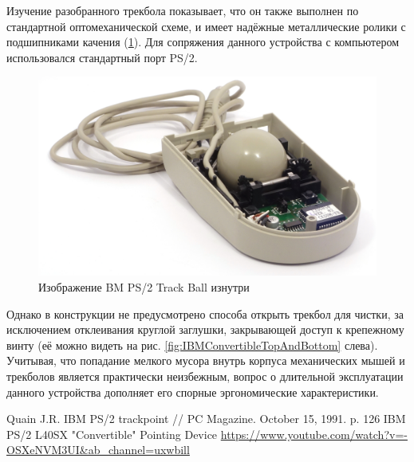 \documentclass[11pt, a4paper]{article}
\begin{document}
Изучение разобранного трекбола показывает, что он также выполнен по стандартной оптомеханической схеме, и имеет надёжные металлические ролики с подшипниками качения (\ref{fig:IBMConvertibleInside}). Для сопряжения данного устройства с компьютером использовался стандартный порт PS/2.

\begin{figure}[h]
    \centering
    \includegraphics[scale=0.7]{1992_ibm_convertible/inside_60.jpg}
    \caption{Изображение BM PS/2 Track Ball изнутри}
    \label{fig:IBMConvertibleInside}
\end{figure}

Однако в конструкции не предусмотрено способа открыть трекбол для чистки, за исключением отклеивания круглой заглушки, закрывающей доступ к крепежному винту (её можно видеть на рис. \ref{fig:IBMConvertibleTopAndBottom} слева). Учитывая, что попадание мелкого мусора внутрь корпуса механических мышей и трекболов является практически неизбежным, вопрос о длительной эксплуатации данного устройства дополняет его спорные эргономические характеристики.

\begin{thebibliography}{9}
 Quain J.R. IBM PS/2 trackpoint // PC Magazine. October 15, 1991. p. 126
 IBM PS/2 L40SX "Convertible" Pointing Device \url{https://www.youtube.com/watch?v=-OSXeNVM3UI&ab_channel=uxwbill}
\end{thebibliography}
\end{document}

